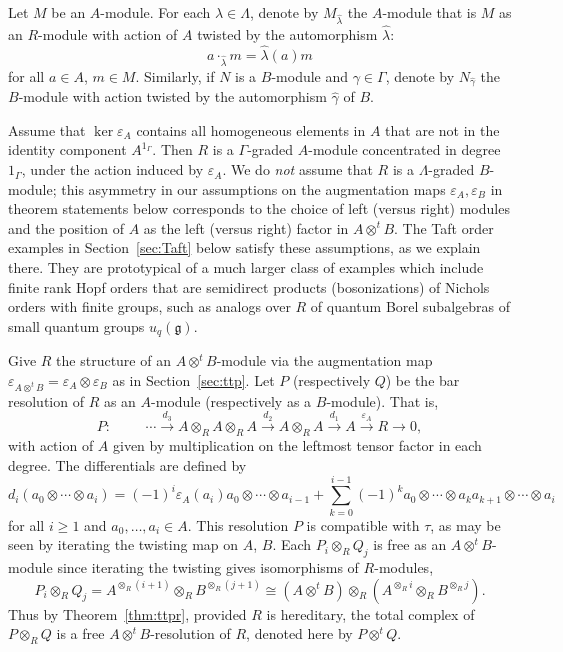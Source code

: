 \documentclass[11pt]{amsart}
\numberwithin{equation}{section}
\theoremstyle{definition}
\theoremstyle{remark}
\newcommand{\g}{\gamma}
\newcommand{\hg}{\widehat{\g}}
\newcommand{\h}{\lambda}
\newcommand{\hh}{\widehat{\h}}
\newcommand\ot{\otimes}
\newcommand\ott{\otimes^{t}\!}
\newcommand{\ttpt}{A\ott B}
\begin{document}
Let $M$ be an $A$-module.
For each $\h\in\Lambda$,
denote by $M_{\hh}$ the $A$-module that is $M$ as an $R$-module
with action of $A$ twisted by the automorphism $\hh$:
\begin{equation}\label{eqn:mod-twist}
a\cdot_{\hh} m = \hh (a) m 
\end{equation}
for all $a\in A$, $m\in M$.
Similarly, if $N$ is a $B$-module and $\g\in\Gamma$,
denote by $N_{\hg}$ the $B$-module with action twisted by
the automorphism $\hg$ of $B$.

Assume that $\ker \varepsilon_A$ contains all homogeneous
elements in $A$ that are not in the identity component $A^{1_{\Gamma}}$.
Then $R$ is a $\Gamma$-graded $A$-module concentrated in degree $1_{\Gamma}$, 
under the action induced by $\varepsilon_A$.
We do {\em not} assume that $R$ is a $\Lambda$-graded $B$-module; 
this asymmetry in our assumptions on the augmentation maps 
$\varepsilon_A, \varepsilon_B$ in theorem statements below corresponds to
the choice of left (versus right) modules and the position of 
$A$ as the left (versus right) factor in $\ttpt$.
The Taft order examples in Section~\ref{sec:Taft} below 
satisfy these assumptions, as we explain there.
They are prototypical of a much larger class of examples which 
include finite rank Hopf orders
that are semidirect products (bosonizations) of Nichols orders with finite groups,
such as analogs over $R$ of quantum Borel subalgebras of small
quantum groups $u_q(\mathfrak{g})$.


Give $R$ the structure of an $A\ott B$-module 
via the augmentation map $\varepsilon_{A\ott B}=\varepsilon_A\ot\varepsilon_B$ 
as in Section~\ref{sec:ttp}. 
  Let $P$ (respectively $Q$) be the 
  bar resolution of $R$ as an
  $A$-module (respectively as a $B$-module).
  That is,
  \begin{equation}\label{eqn:P-bar}
  P: \hspace{1cm}
  \cdots \stackrel{d_3}{\longrightarrow} A\ot_R A\ot_R A
  \stackrel{d_2}{\longrightarrow} A\ot_R A
  \stackrel{d_1}{\longrightarrow} A
  \stackrel{\varepsilon_A}{\longrightarrow} R \longrightarrow 0 ,
  \end{equation}
with action of $A$ given by multiplication on the leftmost tensor
  factor in each degree. The differentials are defined by 
  \[
  d_i (a_0\ot\cdots\ot a_i) =  (-1)^i\varepsilon_A(a_i) a_0\ot\cdots\ot a_{i-1} +
\sum_{k=0}^{i-1} (-1)^k
  a_0\ot\cdots\ot a_ka_{k+1}\ot \cdots \ot a_i 
     \]
for all $i\geq 1$ and $a_0,\ldots, a_i \in A$.
This resolution $P$ is compatible with $\tau$,
as may be seen by iterating the twisting map on $A$, $B$.
Each $P_i\ot_R Q_j$ is free as an $\ttpt$-module since
iterating the twisting gives 
isomorphisms of $R$-modules, 
  \begin{equation}\label{eqn:pqab}
  P_i\ot_R Q_j = A^{\ot_R (i+1)}\ot_R B^{\ot_R (j+1)} \cong
  (A\ott B) \ot_R (A^{\ot_R i}\ot_R B^{\ot_R j}) .
  \end{equation}
Thus by Theorem~\ref{thm:ttpr}, provided $R$ is hereditary, 
the total complex of $P\ot_R Q$ is a free $A\ott B$-resolution of $R$,
denoted here by $P\ott Q$.
\end{document}
